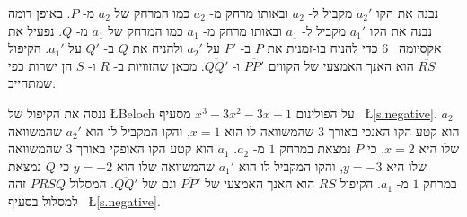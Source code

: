 נבנה את הקו
$a_2'$
מקביל ל-%
$a_2$
ובאותו מרחק מ-%
$a_2$
כמו המרחק של
$a_2$
מ-%
$P$.
באופן דומה נבנה את הקו
$a_1'$
מקביל ל-%
$a_1$
ובאותו מרחק מ-%
$a_1$
כמו המרחק של
$a_1$
מ-%
$Q$.
נפעיל את אקסיומה%
~$6$
כדי להניח בו-זמנית את 
$P$
ב-%
$P'$
על 
$a_2'$
ולהניח את 
$Q$
ב-%
$Q'$
על
$a_1'$.
הקיפול 
$\overline{RS}$
הוא האנך האמצעי של הקווים
$\overline{PP'}$
ו-%
$\overline{QQ'}$.
מכאן שהזוויות ב-%
$R$
ו-%
$S$
הן ישרות כפי שמתחייב.

\newpage

ננסה את הקיפול של 
\L{Beloch}
על הפולינום
$x^3-3x^2-3x+1$
מסעיף%
~\L{\ref{s.negative}}. $a_2$
הוא קטע הקו האנכי באורך
$3$
שהמשוואה לו הוא
$x=1$,
והקו המקביל לו הוא
$a_2'$
שהמשוואה שלו היא
$x=2$,
כי 
$P$
נמצאת במרחק 
$1$ 
מ-%
$a_2$.
$a_1$
הוא קטע הקו האופקי באורך 
$3$
שהמשוואה שלו היא
$y=-3$,
והקו המקביל לו הוא
$a_1'$
שהמשוואה שלו הוא
$y=-2$
כי 
$Q$
נמצאת במרחק
$1$
מ-%
$a_1$.
הקיפול 
$RS$
הוא האנך האמצעי של
$\overline{PP'}$
וגם של
$\overline{QQ'}$.
המסלול
$\overline{PRSQ}$
זהה למסלול בסעיף%
~\L{\ref{s.negative}}.

